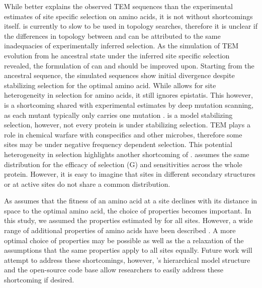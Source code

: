 While \selac better explains the observed TEM sequences than the experimental estimates of site specific selection on amino acids, it is not without shortcomings itself.
\selac is currently to slow to be used in topology searches, therefore it is unclear if the differences in topology between \phydms and \selac can be attributed to the same inadequacies of experimentally inferred selection.
As the simulation of TEM evolution from he ancestral state under the \selac inferred site specific selection revealed, the formulation of \selac can and should be improved upon.
Starting from the ancestral sequence, the simulated sequences show initial divergence despite stabilizing selection for the optimal amino acid.
While \selac allows for site heterogeneity in selection for amino acids, it still ignores epistatis.
This however, is a shortcoming shared with experimental estimates by deep mutation scanning, as each mutant typically only carries one mutation \citep{FirnbergAndOstermeier2012, Jain2014}.
\selac is a model stabilizing selection, however, not every protein is under stabilizing selection.
TEM plays a role in chemical warfare with conspecifics and other microbes, therefore some sites may be under negative frequency dependent selection.
This potential heterogeneity in selection highlights another shortcoming of \selac.
\selac assumes the same distribution for the efficacy of selection (G) and \PC sensitivities across the whole protein.
However, it is easy to imagine that sites in different secondary structures or at active sites do not share a common distribution.


As \selac assumes that the fitness of an amino acid at a site declines with its distance in \PC space to the optimal amino acid, the choice of \PC properties becomes important.
In this study, we assumed the \PC properties estimated by \citet{grantham1974} for all sites.
However, a wide range of additional \PC properties of amino acids have been described \citep{Kawashima2008}.
A more optimal choice of \PC properties may be possible as well as the a relaxation of the assumptions that the same properties apply to all sites equally.
Future work will attempt to address these shortcomings, however, \selac's hierarchical model structure and the open-source code base allow researchers to easily address these shortcoming if desired.

